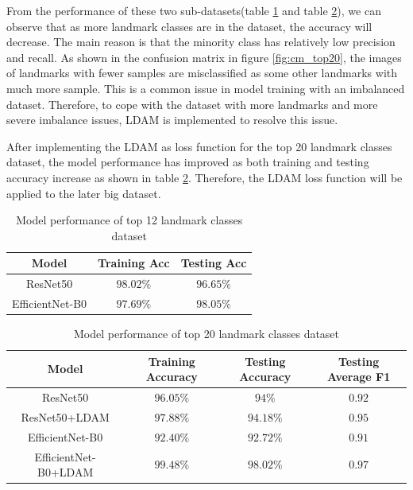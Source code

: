 \documentclass[10pt,twocolumn,letterpaper]{article}
\begin{document}
From the performance of these two sub-datasets(table \ref{tab:table1} and table \ref{tab:table2}), we can observe that as more landmark classes are in the dataset, the accuracy will decrease. The main reason is that the minority class has relatively low precision and recall. As shown in the confusion matrix in figure \ref{fig:cm_top20}, the images of landmarks with fewer samples are misclassified as some other landmarks with much more sample. This is a common issue in model training with an imbalanced dataset. Therefore, to cope with the dataset with more landmarks and more severe imbalance issues, LDAM is implemented to resolve this issue. 

After implementing the LDAM as loss function for the top 20 landmark classes dataset, the model performance has improved as both training and testing accuracy increase as shown in table \ref{tab:table2}. Therefore, the LDAM loss function will be applied to the later big dataset.

\begin{table}[]
    \centering
    \begin{tabular}{c c c}
        \hline Model & Training Acc & Testing Acc \\ \hline
        ResNet50 & $98.02\%$ & $96.65\%$ \\
        EfficientNet-B0 & $97.69\%$ & $98.05\%$ \\ \hline
    \end{tabular}
    \vspace{5pt}
    \caption{Model performance of top 12 landmark classes dataset}
    \label{tab:table1}
\end{table}

\begin{table}
    \centering
    \begin{tabular}{c c c c}
        \hline Model & Training Accuracy & Testing Accuracy & Testing Average F1 \\ \hline
        ResNet50 & $96.05\%$ & $94\%$ & $0.92$ \\
        ResNet50+LDAM & $97.88\%$ & $94.18\%$ & $0.95$ \\
        EfficientNet-B0 & $92.40\%$ & $92.72\%$ & $0.91$ \\ 
        EfficientNet-B0+LDAM & $99.48\%$ & $98.02\%$ & $0.97$ \\ \hline
    \end{tabular}
    \vspace{5pt}
    \caption{Model performance of top 20 landmark classes dataset}
    \label{tab:table2}
\end{table}
\end{document}
